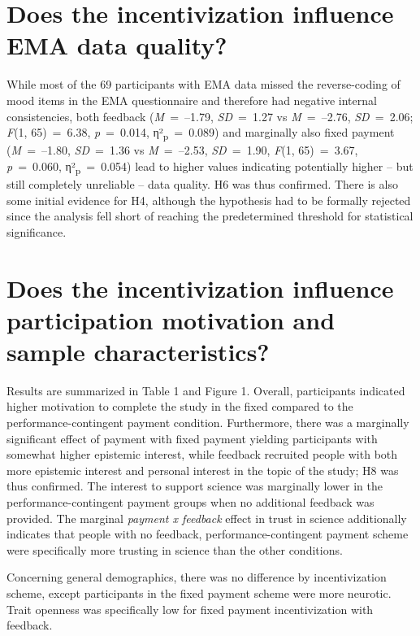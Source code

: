 \documentclass[authordate, empirical]{jote-new-article}
\begin{document}
	\section{\textbf{Does }\textbf{the incentivization}\textbf{ influence EMA data quality?}}



	While most of the 69 participants with EMA data missed the reverse-coding of mood items in the EMA questionnaire and therefore had negative internal consistencies, both feedback (\emph{M }= --1.79, \emph{SD }= 1.27 vs \emph{M }= --2.76, \emph{SD }= 2.06; \emph{F}(1, 65) = 6.38, \emph{p} = 0.014, η²\textsubscript{p} = 0.089) and marginally also fixed payment (\emph{M }= --1.80, \emph{SD }= 1.36 vs \emph{M }= --2.53, \emph{SD }= 1.90, \emph{F}(1, 65) = 3.67, \emph{p} = 0.060, η²\textsubscript{p} = 0.054) lead to higher values indicating potentially higher -- but still completely unreliable -- data quality. H6 was thus confirmed. There is also some initial evidence for H4, although the hypothesis had to be formally rejected since the analysis fell short of reaching the predetermined threshold for statistical significance.



	\section{\textbf{Does }\textbf{the incentivization}\textbf{ influence participation motivation and sample characteristics?}}



	Results are summarized in Table 1 and Figure 1. Overall, participants indicated higher motivation to complete the study in the fixed compared to the performance-contingent payment condition. Furthermore, there was a marginally significant effect of payment with fixed payment yielding participants with somewhat higher epistemic interest, while feedback recruited people with both more epistemic interest and personal interest in the topic of the study; H8 was thus confirmed. The interest to support science was marginally lower in the performance-contingent payment groups when no additional feedback was provided. The marginal \emph{payment x feedback }effect in trust in science additionally indicates that people with no feedback, performance-contingent payment scheme were specifically more trusting in science than the other conditions.



	Concerning general demographics, there was no difference by incentivization scheme, except participants in the fixed payment scheme were more neurotic. Trait openness was specifically low for fixed payment incentivization with feedback.
\end{document}
